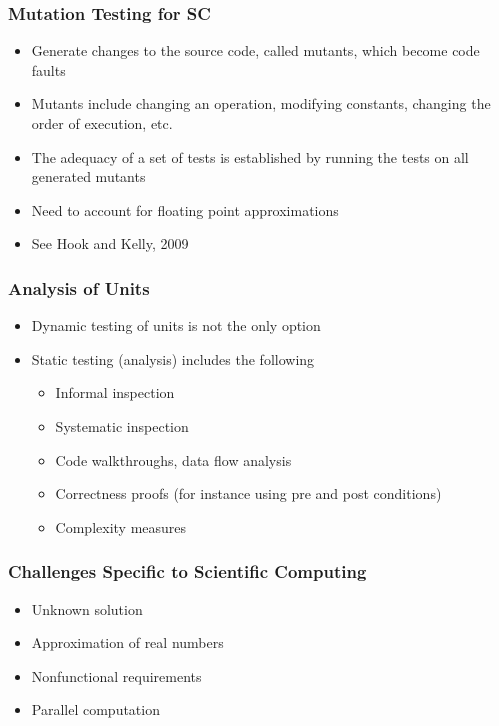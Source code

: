 \documentclass[t,12pt,numbers,fleqn]{beamer}
\begin{document}

\begin{frame}
\frametitle{Mutation Testing for SC}
\begin{itemize}
\item Generate changes to the source code, called mutants, which become code faults
\item Mutants include changing an operation, modifying constants, changing the order of execution, etc.
\item The adequacy of a set of tests is established by running the tests on all generated mutants
\item Need to account for floating point approximations
\item See Hook and Kelly, 2009
\end{itemize}
\end{frame}


\begin{frame}
\frametitle{Analysis of Units}
\begin{itemize}
\item Dynamic testing of units is not the only option
\item Static testing (analysis) includes the following
\begin{itemize}
\item Informal inspection
\item Systematic inspection
\item Code walkthroughs, data flow analysis
\item Correctness proofs (for instance using pre and post conditions)
\item Complexity measures
\end{itemize}
\end{itemize}
\end{frame}


\begin{frame}
\frametitle{Challenges Specific to Scientific Computing}
\begin{itemize}
\item Unknown solution
\item Approximation of real numbers
\item Nonfunctional requirements
\item Parallel computation
\end{itemize}
\end{frame}
\end{document}
